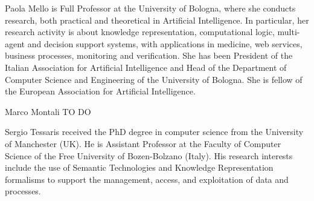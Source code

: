 \documentclass[10pt,journal,compsoc]{IEEEtran}
\theoremstyle{definition}
\theoremstyle{plain}
\begin{document}
\begin{IEEEbiography}{Paola Mello}
is Full Professor at the University of Bologna, where she conducts research, both practical and theoretical in Artificial Intelligence. In particular, her research activity is  about knowledge representation, computational logic, multi-agent and  decision support systems, with applications in medicine, web services, business processes, monitoring and verification.  She has been President of the Italian Association for Artificial Intelligence and Head of the Department of Computer Science and Engineering of the University of Bologna. She is fellow of the European Association for Artificial Intelligence.
\end{IEEEbiography}

\begin{IEEEbiography}{Marco Montali}
TO DO
\end{IEEEbiography}


\begin{IEEEbiography}{Sergio Tessaris}
received the PhD degree in computer science from the University of Manchester (UK). He is Assistant Professor at the Faculty of Computer Science of the Free University of Bozen-Bolzano (Italy). His research interests include the use of Semantic Technologies and Knowledge Representation formalisms to support the management, access, and exploitation of data and processes.
\end{IEEEbiography}

\vfill
\end{document}
